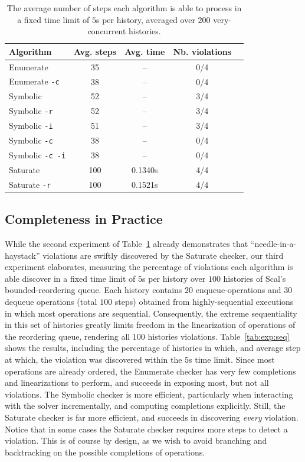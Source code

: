 \begin{table}[t]
  \footnotesize
  \centering
  \setlength{\tabcolsep}{1.8mm}
  \begin{tabular}{lcccc}
    Algorithm & Avg. steps & Avg. time & Nb. violations \\
    \hline
    {\sc Enumerate}             & 35  & --      & 0/4 \\
    {\sc Enumerate} {\tt -c}    & 38  & --      & 0/4 \\
    {\sc Symbolic}              & 52  & --      & 3/4 \\
    {\sc Symbolic} {\tt -r}     & 52  & --      & 3/4 \\
    {\sc Symbolic} {\tt -i}     & 51  & --      & 3/4 \\
    {\sc Symbolic} {\tt -c}     & 38  & --      & 0/4 \\
    {\sc Symbolic} {\tt -c -i}  & 38  & --      & 0/4 \\
    {\sc Saturate}              & 100 & 0.1340s & 4/4 \\
    {\sc Saturate} {\tt -r}     & 100 & 0.1521s & 4/4
  \end{tabular} 

  \caption{The average number of steps each algorithm is able to process in a
  fixed time limit of $5$s per history, averaged over $200$ very-concurrent
  histories.}
  \label{tab:exp:con}
\end{table}


\subsection{Completeness in Practice}
\label{sec:exp:complete}

While the second experiment of Table~\ref{tab:exp:con} already demonstrates
that ``needle-in-a-haystack'' violations are swiftly discovered by the {\sc
Saturate} checker, our third experiment elaborates, measuring the percentage of
violations each algorithm is able discover in a fixed time limit of $5$s per
history over $100$ histories of Scal's bounded-reordering queue. Each history
contains $20$ {\sf enqueue}-operations and $30$ {\sf dequeue} operations (total
$100$ steps) obtained from highly-sequential executions in which most
operations are sequential. Consequently, the extreme sequentiality in this set
of histories greatly limits freedom in the linearization of operations of the
reordering queue, rendering all $100$ histories violations.
Table~\ref{tab:exp:seq} shows the results, including the percentage of
histories in which, and average step at which, the violation was discovered
within the $5$s time limit. Since most operations are already ordered, the {\sc
Enumerate} checker has very few completions and linearizations to perform, and
succeeds in exposing most, but not all violations. The {\sc Symbolic} checker
is more efficient, particularly when interacting with the solver incrementally,
and computing completions explicitly. Still, the {\sc Saturate} checker is far
more efficient, and succeeds in discovering \emph{every} violation. Notice that
in some cases the {\sc Saturate} checker requires more steps to detect a
violation. This is of course by design, as we wish to avoid branching and
backtracking on the possible completions of operations.


